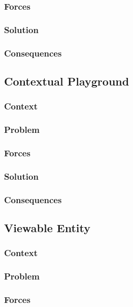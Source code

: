 \documentclass[sigconf]{acmart}
\begin{document}
\subsubsection*{Forces}
\subsubsection*{Solution}
\subsubsection*{Consequences}


\subsection{Contextual Playground}
\subsubsection*{Context}
\subsubsection*{Problem}
\subsubsection*{Forces}
\subsubsection*{Solution}
\subsubsection*{Consequences}


\subsection{Viewable Entity}
\subsubsection*{Context}
\subsubsection*{Problem}
\subsubsection*{Forces}
\end{document}

